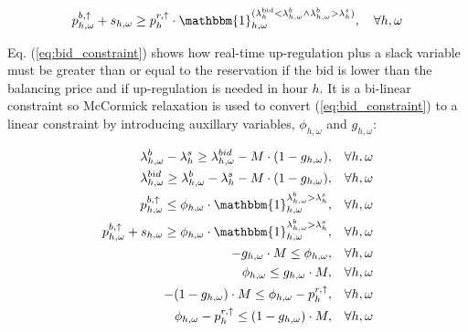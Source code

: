 \begin{equation}\label{eq:bid_constraint}
    p^{b, \uparrow}_{h,\omega} + s_{h,\omega} \geq p^{r,\uparrow}_{h} \cdot \mathbbm{1}_{h,\omega}^{(\lambda^{\text{bid}}_{h} < \lambda^{b}_{h,\omega} \land \lambda^{b}_{h,\omega} > \lambda^{s}_{h})}, \quad \forall{h,\omega}
\end{equation}

Eq. (\ref{eq:bid_constraint}) shows how real-time up-regulation plus a slack variable must be greater than or equal to the reservation if the bid is lower than the balancing price and if up-regulation is needed in hour $h$. It is a bi-linear constraint so McCormick relaxation \cite{mccormick1976computability} is used to convert (\ref{eq:bid_constraint}) to a linear constraint by introducing auxillary variables, $\phi_{h,\omega}$ and $g_{h,\omega}$:

\begin{subequations}\label{eq:bid_constraint_relaxed}
    \begin{align}
        \lambda_{h,\omega}^{b} - \lambda_{h}^{s} \geq \lambda_{h,\omega}^{bid} - M \cdot (1 - g_{h,\omega}) , \quad                                   & \forall{h,\omega}             \label{con_bid:subeq1} \\
        \lambda_{h,\omega}^{bid} \geq \lambda_{h,\omega}^{b} - \lambda_{h}^{s} - M \cdot (1 - g_{h,\omega}) , \quad                                   & \forall{h,\omega}             \label{con_bid:subeq2} \\
        p^{b, \uparrow}_{h,\omega} \leq \phi_{h,\omega} \cdot \mathbbm{1}_{h,\omega}^{\lambda^{b}_{h,\omega} > \lambda^{s}_{h}}, \quad                & \forall{{h,\omega}}           \label{con_bid:subeq3} \\
        p^{b, \uparrow}_{h,\omega} + s_{h,\omega} \geq \phi_{h,\omega} \cdot \mathbbm{1}_{h,\omega}^{\lambda^{b}_{h,\omega} > \lambda^{s}_{h}}, \quad & \forall{{h,\omega}}           \label{con_bid:subeq4} \\
        -g_{h,\omega} \cdot M \leq \phi_{h,\omega}, \quad                                                                                             & \forall{h,\omega}             \label{con_bid:subeq5} \\
        \phi_{h,\omega} \leq g_{h,\omega} \cdot M, \quad                                                                                              & \forall{h,\omega}             \label{con_bid:subeq6} \\
        -(1 - g_{h,\omega}) \cdot M \leq \phi_{h,\omega} - p^{r,\uparrow}_{h}, \quad                                                                  & \forall{h,\omega}             \label{con_bid:subeq7} \\
        \phi_{h,\omega} - p^{r,\uparrow}_{h} \leq (1 - g_{h,\omega}) \cdot M, \quad                                                                   & \forall{h,\omega}             \label{con_bid:subeq8}
    \end{align}
\end{subequations}


